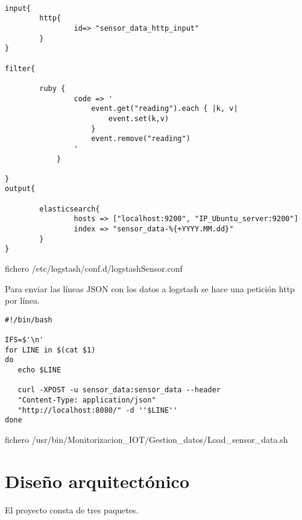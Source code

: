 \begin{verbatim}    

input{
        http{
                id=> "sensor_data_http_input"
        }
}

filter{

        ruby {
                code => '
                    event.get("reading").each { |k, v|
                        event.set(k,v)
                    }
                    event.remove("reading")
                '
            }

}
output{

        elasticsearch{
                hosts => ["localhost:9200", "IP_Ubuntu_server:9200"]
                index => "sensor_data-%{+YYYY.MM.dd}"
        }
}

\end{verbatim}  
\caption{fichero  /etc/logstash/conf.d/logstashSensor.conf}    


Para enviar las líneas JSON con los datos a logstash se hace una petición http por línea.
\begin{verbatim}    
#!/bin/bash

IFS=$'\n'
for LINE in $(cat $1)
do
   echo $LINE
   
   curl -XPOST -u sensor_data:sensor_data --header 
   "Content-Type: application/json" 
   "http://localhost:8080/" -d ''$LINE''
done
\end{verbatim}  
\caption{fichero /usr/bin/Monitorizacion\_IOT/Gestion\_datos/Load\_sensor\_data.sh}    


    
\section{Diseño arquitectónico}

El proyecto consta de tres paquetes.

